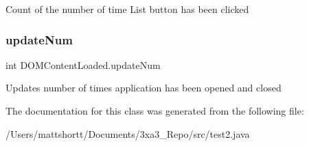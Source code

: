 Count of the number of time \textquotesingle{}List\textquotesingle{} button has been clicked \mbox{\label{class_d_o_m_content_loaded_a8d1dde1fba9833ca47cf48b8fac4f5fc}} 
\subsubsection{\texorpdfstring{update\+Num}{updateNum}}
{\footnotesize\ttfamily int D\+O\+M\+Content\+Loaded.\+update\+Num}

Updates number of times application has been opened and closed 

The documentation for this class was generated from the following file\+:\begin{DoxyCompactItemize}
\item 
/\+Users/mattshortt/\+Documents/3xa3\+\_\+\+Repo/src/test2.\+java\end{DoxyCompactItemize}
